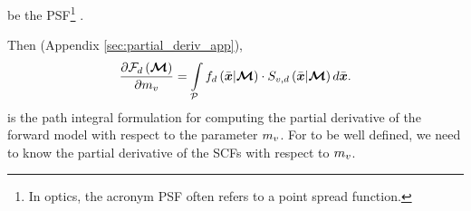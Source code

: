 \documentclass{article}
\begin{document}
be the \ac{PSF}\footnote{In optics, the acronym \ac{PSF} often refers to a point spread function. } \citep{shem2020towards}. 

Then (Appendix \ref{sec:partial_deriv_app}),
\begin{equation}
\label{eq:int_derivative_full}
\frac{\partial \forwardmodel_{\nm}\regpar{\sceneparam}}{\partial \scenescalar_{\unknownindex}} =  \intop_{\pathset}{\contfunc_{\nm}\regpar{\ppath|\sceneparam}\cdot \scorefunc_{\unknownindex,\nm}\regpar{\ppath|\sceneparam} d\ppath}.
\end{equation}
is the path integral formulation for computing the partial derivative of the forward model with respect to the parameter $m_{v}$. For \eqs{\ref{eq:total_derivative_factor},\ref{eq:int_derivative_full}} to be well defined, we need to know the partial derivative of the \ac{SCF}s with respect to $m_{v}$. 
\end{document}

